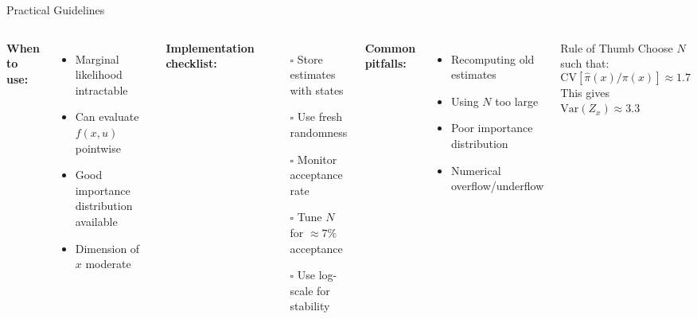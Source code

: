 \documentclass[aspectratio=169]{beamer}
\begin{document}
\begin{frame}{Practical Guidelines}

\begin{columns}
\textbf{When to use:}
\begin{itemize}
    \item Marginal likelihood intractable
    \item Can evaluate $f(x,u)$ pointwise
    \item Good importance distribution available
    \item Dimension of $x$ moderate
\end{itemize}

\vspace{0.5cm}
\textbf{Implementation checklist:}
\begin{enumerate}
    \item[\color{copenhagenred}$\square$] Store estimates with states
    \item[\color{copenhagenred}$\square$] Use fresh randomness
    \item[\color{copenhagenred}$\square$] Monitor acceptance rate
    \item[\color{copenhagenred}$\square$] Tune $N$ for $\approx 7\%$ acceptance
    \item[\color{copenhagenred}$\square$] Use log-scale for stability
\end{enumerate}

\textbf{Common pitfalls:}
\begin{itemize}
    \item Recomputing old estimates
    \item Using $N$ too large
    \item Poor importance distribution
    \item Numerical overflow/underflow
\end{itemize}

\vspace{0.5cm}
\begin{block}{Rule of Thumb}
Choose $N$ such that:
$$\text{CV}[\hat{\pi}(x)/\pi(x)] \approx 1.7$$
This gives $\text{Var}(Z_x) \approx 3.3$
\end{block}
\end{columns}
\end{frame}
\end{document}
